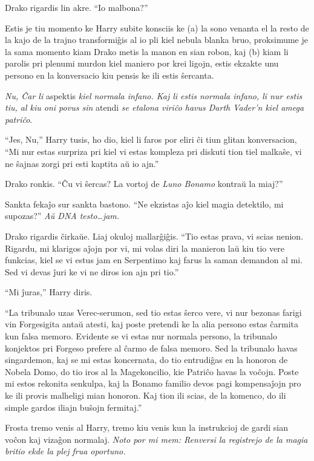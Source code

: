 Drako rigardis lin akre. ``Io malbona?''

Estis je tiu momento ke Harry subite konsciis ke (a) la sono venanta
el la resto de la kajo de la trajno transformiĝis al io pli kiel
nebula blanka bruo, proksimume je la sama momento kiam Drako metis la
manon en sian robon, kaj (b) kiam li parolis pri plenumi murdon kiel
maniero por krei ligojn, estis ekzakte unu persono en la konversacio
kiu pensis ke ili estis ŝercanta.

\emph{Nu, Ĉar li} aspektis \emph{kiel normala infano. Kaj li estis
  normala infano, li nur estis tiu, al kiu oni povus sin} atendi
\emph{ se etalona viriĉo havus Darth Vader'n kiel amega patriĉo}.

``Jes, Nu,'' Harry tusis, ho dio, kiel li faros por eliri ĉi tiun
glitan konversacion, ``Mi nur estas surpriza pri kiel vi estas
kompleza pri diskuti tion tiel malkaŝe, vi ne ŝajnas zorgi pri esti
kaptita aŭ io ajn.''

Drako ronkis. ``Ĉu vi ŝercas? La vortoj de \emph{Luno Bonamo}
kontraŭ la miaj?''

Sankta fekaĵo sur sankta bastono. ``Ne ekzistas aĵo kiel magia
detektilo, mi supozas?'' \emph{Aŭ DNA testo\ldots jam.}


Drako rigardis ĉirkaŭe. Liaj okuloj mallarĝiĝis. ``Tio estas prava, vi
scias nenion. Rigardu, mi klarigos aĵojn por vi, mi volas diri la
manieron laŭ kiu tio vere funkcias, kiel se vi estus jam en Serpentimo
kaj farus la saman demandon al mi. Sed vi devas ĵuri ke vi ne diros ion ajn
pri tio.''

``Mi ĵuras,'' Harry diris.

``La tribunalo uzas Verec-serumon, sed tio estas ŝerco vere, vi nur
bezonas farigi vin Forgesigita antaŭ atesti, kaj poste pretendi ke la
alia persono estas ĉarmita kun falsa memoro. Evidente se vi estas nur
normala persono, la tribunalo konjektos pri Forgeso prefere al ĉarmo
de falsa memoro. Sed la tribunalo havas singardemon, kaj se mi estas
koncernata, do tio entrudiĝas en la honoron de Nobela Domo, do tio
iros al la Magekoncilio, kie Patriĉo havas la voĉojn. Poste mi estos
rekonita senkulpa, kaj la Bonamo familio devos pagi kompensaĵojn pro
ke ili provis malheligi mian honoron. Kaj tion ili scias, de la
komenco, do ili simple gardos iliajn buŝojn fermitaj.''

Frosta tremo venis al Harry, tremo kiu venis kun la instrukcioj de
gardi sian voĉon kaj vizaĝon normalaj. \emph{Noto por mi mem: Renversi
  la registrejo de la magia britio ekde la plej frua oportuno.}

